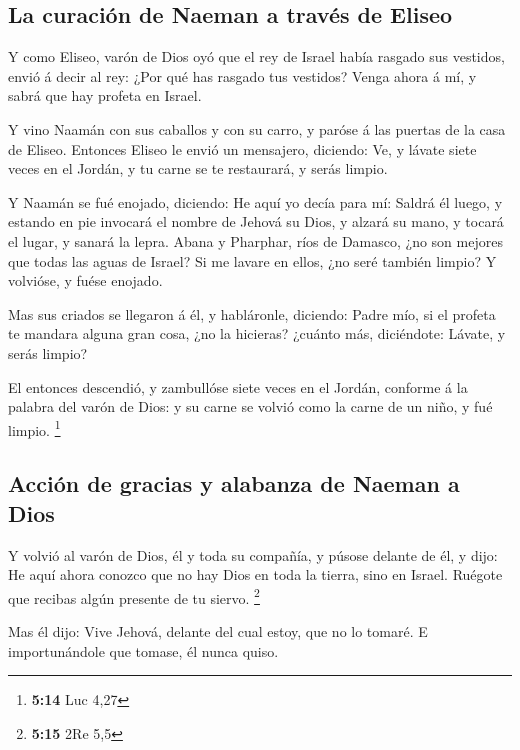 \hypertarget{la-curaciuxf3n-de-naeman-a-travuxe9s-de-eliseo}{%
\subsection{La curación de Naeman a través de
Eliseo}\label{la-curaciuxf3n-de-naeman-a-travuxe9s-de-eliseo}}

 Y como Eliseo, varón de Dios oyó que el rey de Israel
había rasgado sus vestidos, envió á decir al rey: ¿Por qué has rasgado
tus vestidos? Venga ahora á mí, y sabrá que hay profeta en Israel.

 Y vino Naamán con sus caballos y con su carro, y paróse á
las puertas de la casa de Eliseo.  Entonces Eliseo le
envió un mensajero, diciendo: Ve, y lávate siete veces en el Jordán, y
tu carne se te restaurará, y serás limpio.

 Y Naamán se fué enojado, diciendo: He aquí yo decía para
mí: Saldrá él luego, y estando en pie invocará el nombre de Jehová su
Dios, y alzará su mano, y tocará el lugar, y sanará la lepra.
 Abana y Pharphar, ríos de Damasco, ¿no son mejores que
todas las aguas de Israel? Si me lavare en ellos, ¿no seré también
limpio? Y volvióse, y fuése enojado.

 Mas sus criados se llegaron á él, y habláronle,
diciendo: Padre mío, si el profeta te mandara alguna gran cosa, ¿no la
hicieras? ¿cuánto más, diciéndote: Lávate, y serás limpio?

 El entonces descendió, y zambullóse siete veces en el
Jordán, conforme á la palabra del varón de Dios: y su carne se volvió
como la carne de un niño, y fué limpio. \footnote{\textbf{5:14} Luc 4,27}

\hypertarget{acciuxf3n-de-gracias-y-alabanza-de-naeman-a-dios}{%
\subsection{Acción de gracias y alabanza de Naeman a
Dios}\label{acciuxf3n-de-gracias-y-alabanza-de-naeman-a-dios}}

 Y volvió al varón de Dios, él y toda su compañía, y
púsose delante de él, y dijo: He aquí ahora conozco que no hay Dios en
toda la tierra, sino en Israel. Ruégote que recibas algún presente de tu
siervo. \footnote{\textbf{5:15} 2Re 5,5}

 Mas él dijo: Vive Jehová, delante del cual estoy, que no
lo tomaré. E importunándole que tomase, él nunca quiso.

